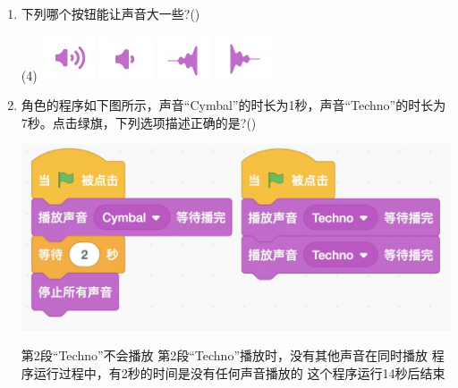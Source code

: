 \documentclass[10pt, a4paper]{article}
\begin{document}
\begin{enumerate}
        \item 下列哪个按钮能让声音大一些?(\qquad)
        \begin{tasks}(4)
            \task \includegraphics[width=.05\textwidth]{18a.jpg}
            \task \includegraphics[width=.05\textwidth]{18b.jpg}
            \task \includegraphics[width=.05\textwidth]{18c.jpg}
            \task \includegraphics[width=.05\textwidth]{18d.jpg}
        \end{tasks}

        \item 角色的程序如下图所示，声音“Cymbal”的时长为1秒，声音“Techno”的时长为7秒。点击绿旗，下列选项描述正确的是?(\qquad)
        
        \begin{minipage}{.38\textwidth}
            \includegraphics[width=\textwidth]{19.jpg}
        \end{minipage}
        \begin{minipage}{.57\textwidth}
            \begin{tasks}
                \task 第2段“Techno”不会播放
                \task 第2段“Techno”播放时，没有其他声音在同时播放
                \task 程序运行过程中，有2秒的时间是没有任何声音播放的
                \task 这个程序运行14秒后结束
            \end{tasks}
        \end{minipage}
        


\end{enumerate}
\end{document}
